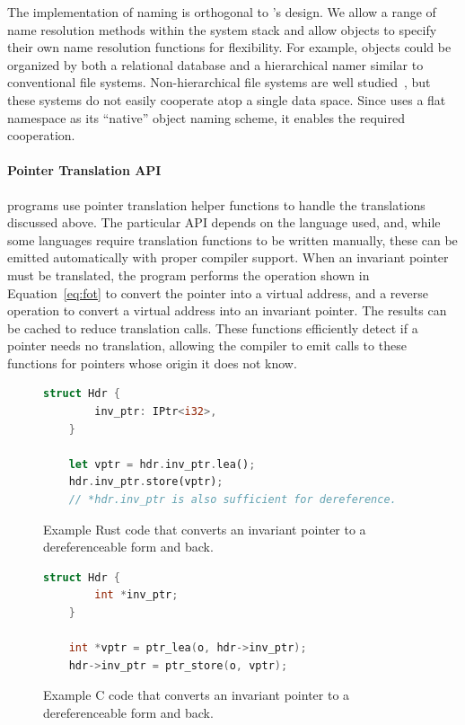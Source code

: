 The implementation of naming is orthogonal to \Twizzler's design. We
allow a range of name resolution methods within the system stack
and allow objects to specify their own name resolution functions for flexibility. For example,
objects could be organized by both a relational database and a hierarchical namer
similar to conventional file systems. Non-hierarchical file systems
are well studied~\cite{gifford:sosp91, ames:mss06, padioleau:usenix03, gopal:osdi99,
    parkerwood:systor14}, but these systems do not easily cooperate atop a single data space.
Since \Twizzler uses a flat namespace as its ``native'' object naming scheme, it
enables the required cooperation.


\paragraph{Pointer Translation API}

\Twizzler programs use pointer translation helper functions to handle the
translations discussed above. The particular API depends on the language used, and, while some languages require
translation functions to be written manually, these can be emitted automatically with proper compiler support.
When an invariant pointer must be
translated, the program performs the operation shown in Equation~\ref{eq:fot} to convert the pointer into a
virtual address, and a reverse operation to convert a virtual address into an invariant pointer.
The results can be cached to reduce translation calls.
These functions efficiently detect if a pointer needs no translation,
allowing the compiler to emit calls to these functions for pointers whose
origin it does not know.



\begin{figure}
    \begin{lstlisting}[language=Rust]
    struct Hdr {
        inv_ptr: IPtr<i32>,
    }

    let vptr = hdr.inv_ptr.lea();
    hdr.inv_ptr.store(vptr);
    // *hdr.inv_ptr is also sufficient for dereference.
\end{lstlisting}
    \caption[Invariant pointer Rust example]{Example Rust code that converts an invariant pointer to a dereferenceable form and back.}
    \label{fig:rustex}
\end{figure}

\begin{figure}
    \hspace*{-2.6cm}
    \begin{lstlisting}[language=C]
    struct Hdr {
        int *inv_ptr;
    }

    int *vptr = ptr_lea(o, hdr->inv_ptr);
    hdr->inv_ptr = ptr_store(o, vptr);
\end{lstlisting}
    \caption[Invariant pointer C example]{Example C code that converts an invariant pointer to a dereferenceable form and back.}
    \label{fig:cex}
\end{figure}


